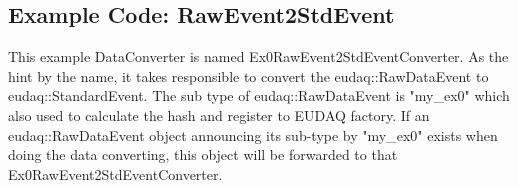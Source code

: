 \subsection{Example Code: RawEvent2StdEvent}\label{sec:Ex0RawEvent2StdEventConverter_cc}
This example DataConverter is named Ex0RawEvent2StdEventConverter. As the hint by the name, it takes responsible to convert the eudaq::RawDataEvent to eudaq::StandardEvent. The sub type of eudaq::RawDataEvent is "my\_ex0" which also used to calculate the hash and register to EUDAQ factory. If an eudaq::RawDataEvent object announcing its sub-type by "my\_ex0" exists when doing the data converting, this object will be forwarded to that Ex0RawEvent2StdEventConverter.



